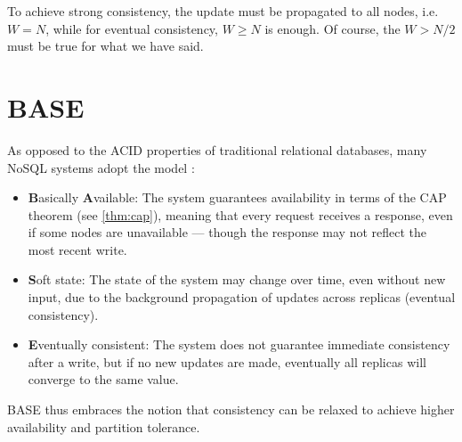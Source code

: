 To achieve strong consistency, the update must be propagated to all nodes, i.e. \(W = N\), while for eventual consistency, \(W \geq N\) is enough. Of course, the \(W > N/2\) must be true for what we have said.

\section{BASE}
As opposed to the ACID properties of traditional relational databases, many NoSQL systems adopt the  model \cite{sadalage2012nosql}:
\begin{itemize}
    \item \textbf{B}asically \textbf{A}vailable: The system guarantees availability in terms of the CAP theorem (see \cref{thm:cap}), meaning that every request receives a response, even if some nodes are unavailable --- though the response may not reflect the most recent write.
    \item \textbf{S}oft state: The state of the system may change over time, even without new input, due to the background propagation of updates across replicas (eventual consistency).
    \item \textbf{E}ventually consistent: The system does not guarantee immediate consistency after a write, but if no new updates are made, eventually all replicas will converge to the same value.
\end{itemize}
BASE thus embraces the notion that consistency can be relaxed to achieve higher availability and partition tolerance.

